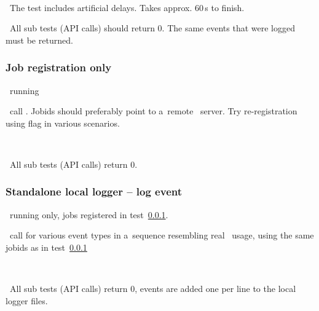 \how\ 
%

\note\ The test includes artificial delays. Takes approx. 60\,s to finish.

\result\ All sub tests (API calls) should return 0. The same events that were logged must be returned.


\subsubsection{Job registration only}
\label{reg}
\req\ running 

\what\ call . Jobids should preferably point
to a~remote \LB\ server. Try re-registration using flag  in various scenarios.

\how\ 

\result\ All sub tests (API calls) return 0.




\subsubsection{Standalone local logger -- log event}
\label{log}

\req\ running  only, jobs registered in test~\ref{reg}.

\what\ call  for various event types in a~sequence
resembling real \LB\ usage, using the same jobids as in test~\ref{reg}

\how\ 

\result\ All sub tests (API calls) return 0, events are added one per line to the local logger files.



